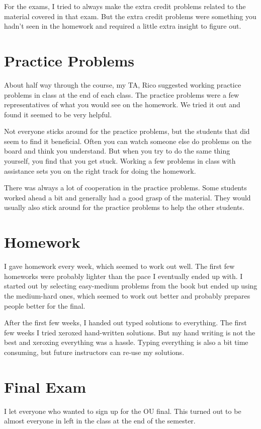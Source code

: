\documentclass{article}
\begin{document}
For the exams, I tried to always make the extra credit problems related to the material covered in that exam.  But the
extra credit problems were something you hadn't seen in the homework and required a little extra insight to figure out.

\section{Practice Problems}
About half way through the course, my TA, Rico suggested working practice problems in class at the end of each class.  The
practice problems were a few representatives of what you would see on the homework.  We tried it out and found it seemed
to be very helpful.

Not everyone sticks around for the practice problems, but the students that did seem to find it beneficial.  Often you
can watch someone else do problems on the board and think you understand.  But when you try to do the same thing
yourself, you find that you get stuck.  Working a few problems in class with assistance sets you on the right track for
doing the homework.  

There was always a lot of cooperation in the practice problems.  Some students worked ahead a bit and generally had a
good grasp of the material.  They would usually also stick around for the practice problems to help the other students.

\section{Homework} 
I gave homework every week, which seemed to work out well.  The first few homeworks were probably lighter than the pace
I eventually ended up with.  I started out by selecting easy-medium problems from the book but ended up using the
medium-hard ones, which seemed to work out better and probably prepares people better for the final.

After the first few weeks, I handed out typed solutions to everything.  The first few weeks I tried xeroxed hand-written
solutions.  But my hand writing is not the best and xeroxing everything was a hassle.  Typing everything is also a bit
time consuming, but future instructors can re-use my solutions.

\section{Final Exam}
I let everyone who wanted to sign up for the OU final.  This turned
out to be almost everyone in left in the class at the end of the semester.
\end{document}
